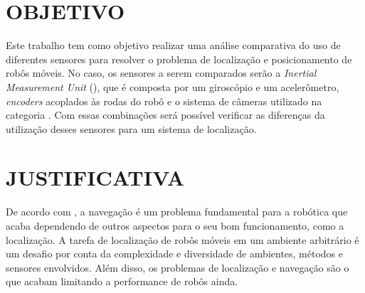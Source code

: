 \documentclass[acronym, symbols, table]{fei}
\begin{document}
	\section{OBJETIVO}
	
		Este trabalho tem como objetivo realizar uma análise comparativa do uso de diferentes sensores para resolver o problema de localização e posicionamento de robôs móveis. No caso, os sensores a serem comparados serão a \textit{Inertial Measurement Unit} (), que é composta por um giroscópio e um acelerômetro, \textit{encoders} acoplados às rodas do robô e o sistema de câmeras utilizado na categoria . Com essas combinações será possível verificar as diferenças da utilização desses sensores para um sistema de localização.
	
%		
%		
%		
		
	\section{JUSTIFICATIVA}
	
		De acordo com \textcite{alatise2020review}, a navegação é um problema fundamental para a robótica que acaba dependendo de outros aspectos para o seu bom funcionamento, como a localização. A tarefa de localização de robôs móveis em um ambiente arbitrário é um desafio por conta da complexidade e diversidade de ambientes, métodos e sensores envolvidos. Além disso, os problemas de localização e navegação são o que acabam limitando a performance de robôs ainda.
		
\end{document}
